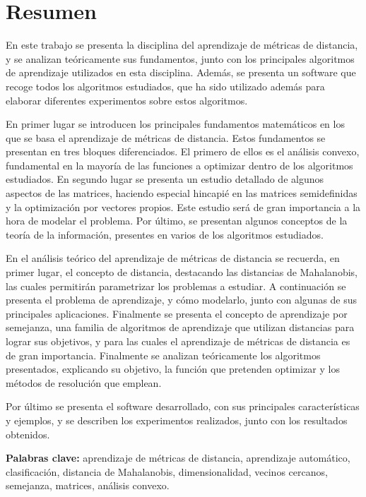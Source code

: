 \chapter*{Resumen}

En este trabajo se presenta la disciplina del aprendizaje de métricas de distancia, y se analizan teóricamente sus fundamentos, junto con los principales algoritmos de aprendizaje utilizados en esta disciplina. Además, se presenta un software que recoge todos los algoritmos estudiados, que ha sido utilizado además para elaborar diferentes experimentos sobre estos algoritmos.

En primer lugar se introducen los principales fundamentos matemáticos en los que se basa el aprendizaje de métricas de distancia. Estos fundamentos se presentan en tres bloques diferenciados. El primero de ellos es el análisis convexo, fundamental en la mayoría de las funciones a optimizar dentro de los algoritmos estudiados. En segundo lugar se presenta un estudio detallado de algunos aspectos de las matrices, haciendo especial hincapié en las matrices semidefinidas y la optimización por vectores propios. Este estudio será de gran importancia a la hora de modelar el problema. Por último, se presentan algunos conceptos de la teoría de la información, presentes en varios de los algoritmos estudiados.

En el análisis teórico del aprendizaje de métricas de distancia se recuerda, en primer lugar, el concepto de distancia, destacando las distancias de Mahalanobis, las cuales permitirán parametrizar los problemas a estudiar. A continuación se presenta el problema de aprendizaje, y cómo modelarlo, junto con algunas de sus principales aplicaciones. Finalmente se presenta el concepto de aprendizaje por semejanza, una familia de algoritmos de aprendizaje que utilizan distancias para lograr sus objetivos, y para las cuales el aprendizaje de métricas de distancia es de gran importancia. Finalmente se analizan teóricamente los algoritmos presentados, explicando su objetivo, la función que pretenden optimizar y los métodos de resolución que emplean.

Por último se presenta el software desarrollado, con sus principales características y ejemplos, y se describen los experimentos realizados, junto con los resultados obtenidos.

\textbf{Palabras clave:} aprendizaje de métricas de distancia, aprendizaje automático, clasificación, distancia de Mahalanobis, dimensionalidad, vecinos cercanos, semejanza, matrices, análisis convexo.